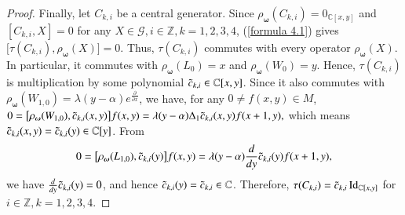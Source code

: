 \documentclass[12pt,reqno]{amsart}
\def\Z{\mathbb{Z}}
\def\C{\mathbb{C}}
\numberwithin{equation}{section}
\begin{document}
\begin{proof}
Finally, let $C_{k,i}$ be a central generator. Since $\rho_{\boldsymbol{\omega}}(C_{k,i})=0_{\C[x,y]}$ and $[C_{k,i},X]=0$ for any $X\in \mathcal{G},i\in\Z,k=1,2,3,4$, (\ref{formula 4.1}) gives $\big[\tau(C_{k,i}),\rho_{\boldsymbol{\omega}}(X)  \big]=0$.
Thus, $\tau(C_{k,i})$ commutes with every operator $\rho_{\boldsymbol{\omega}}(X)$. In particular, it commutes with $\rho_{\boldsymbol{\omega}}(L_0)=x$ and $\rho_{\boldsymbol{\omega}}(W_0)=y$. Hence, $\tau(C_{k,i})$ is multiplication by some polynomial $\Tilde{c}_{k,i}\in\C[x,y]$. Since it also commutes with $\rho_{\boldsymbol{\omega}}(W_{1,0})=\lambda(y-\alpha)e^{\frac{\partial}{\partial{x}}}$, we have, for any $0\neq f(x,y)\in M$, $0=\big[  \rho_{\boldsymbol{\omega}}(W_{1,0}), \Tilde{c}_{k,i}(x,y) \big]f(x,y)=\lambda(y-\alpha)\Delta_1\Tilde{c}_{k,i}(x,y)f(x+1,y),$
which means $\Tilde{c}_{k,i}(x,y)=\Tilde{c}_{k,i}(y)\in\C[y]$. From 
    $$0=\big[  \rho_{\boldsymbol{\omega}}(L_{1,0}), \Tilde{c}_{k,i}(y) \big]f(x,y)=\lambda(y-\alpha)\frac{d}{dy}\Tilde{c}_{k,i}(y)f(x+1,y),$$
we have $\frac{d}{dy}\Tilde{c}_{k,i}(y)=0$, and hence $\Tilde{c}_{k,i}(y)=\Tilde{c}_{k,i}\in\C$. Therefore, $\tau(C_{k,i})=\Tilde{c}_{k,i}\operatorname{Id}_{\C[x,y]}$ for $i\in\Z,k=1,2,3,4$.
\end{proof}
\end{document}
